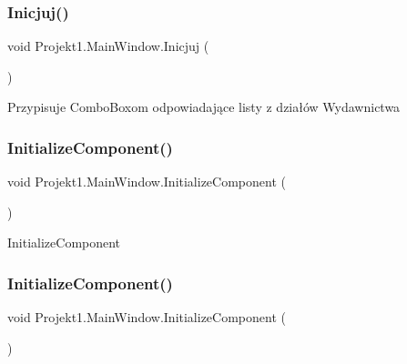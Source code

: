 \subsubsection{\texorpdfstring{Inicjuj()}{Inicjuj()}}
{\footnotesize\ttfamily void Projekt1.\+Main\+Window.\+Inicjuj (\begin{DoxyParamCaption}{ }\end{DoxyParamCaption})\hspace{0.3cm}{\ttfamily [private]}}



Przypisuje Combo\+Boxom odpowiadające listy z działów Wydawnictwa 

\mbox{\label{class_projekt1_1_1_main_window_a3057345890f0202534dd2144a741ca57}} 
\subsubsection{\texorpdfstring{InitializeComponent()}{InitializeComponent()}\hspace{0.1cm}{\footnotesize\ttfamily [1/3]}}
{\footnotesize\ttfamily void Projekt1.\+Main\+Window.\+Initialize\+Component (\begin{DoxyParamCaption}{ }\end{DoxyParamCaption})}



Initialize\+Component 

\mbox{\label{class_projekt1_1_1_main_window_a3057345890f0202534dd2144a741ca57}} 
\subsubsection{\texorpdfstring{InitializeComponent()}{InitializeComponent()}\hspace{0.1cm}{\footnotesize\ttfamily [2/3]}}
{\footnotesize\ttfamily void Projekt1.\+Main\+Window.\+Initialize\+Component (\begin{DoxyParamCaption}{ }\end{DoxyParamCaption})}



